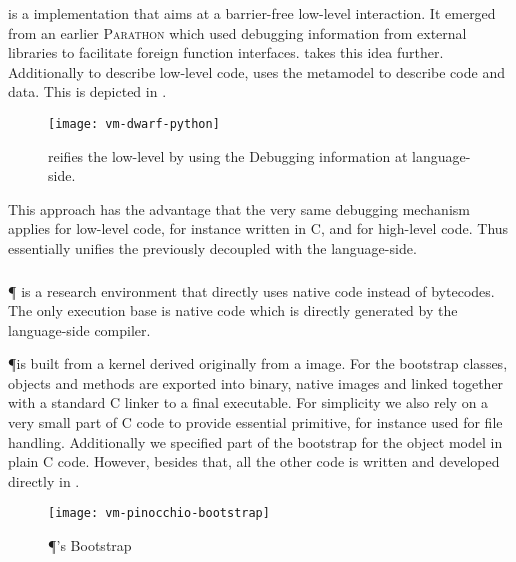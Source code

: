 \DwarfPython \cite{Kell11a} is a \Python implementation that aims at a barrier-free low-level interaction.
It emerged from an earlier \textsc{Parathon} which used \Dwarf debugging information from external libraries to facilitate foreign function interfaces.
\DwarfPython takes this idea further.
Additionally to describe low-level code, \DwarfPython uses the \Dwarf metamodel to describe \Python code and data.
This is depicted in .
%
\begin{figure}[h]
	\centering
	\texttt{[image: vm-dwarf-python]}
	\caption[\DwarfPython Low-level Reification]{\DwarfPython reifies the low-level \VM by using the \Dwarf Debugging information at language-side.}
\end{figure}
%
This approach has the advantage that the very same debugging mechanism applies for low-level code, for instance written in C, and for high-level \Python code.
Thus \DwarfPython essentially unifies the previously decoupled \VM with the language-side.

\subsubsection*{\Pinocchio \VM}

\P \cite{Verw11a} is a research \ST environment that directly uses native code instead of bytecodes.
The only execution base is native code which is directly generated by the language-side compiler.

\P is built from a kernel derived originally from a \PH image.
For the bootstrap classes, objects and methods are exported into binary, native images and linked together with a standard C linker to a final executable.
For simplicity we also rely on a very small part of C code to provide essential primitive, for instance used for file handling.
Additionally we specified part of the bootstrap for the \ST object model in plain C code.
However, besides that, all the other code is written and developed directly in \ST.
%
\begin{figure}[h]
	\centering
	\texttt{[image: vm-pinocchio-bootstrap]}
	\caption{\P's Bootstrap}
\end{figure}

